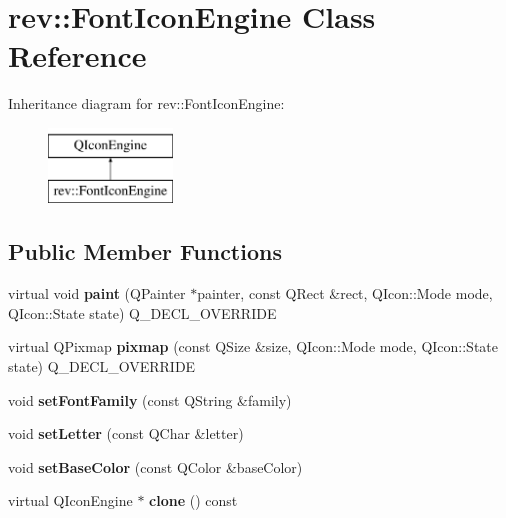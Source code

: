 \hypertarget{classrev_1_1_font_icon_engine}{}\section{rev\+::Font\+Icon\+Engine Class Reference}
\label{classrev_1_1_font_icon_engine}
Inheritance diagram for rev\+::Font\+Icon\+Engine\+:\begin{figure}[H]
\begin{center}
\leavevmode
\includegraphics[height=2.000000cm]{classrev_1_1_font_icon_engine}
\end{center}
\end{figure}
\subsection*{Public Member Functions}
\begin{DoxyCompactItemize}
\item 
\mbox{\label{classrev_1_1_font_icon_engine_a8b9b31bd251825774e56c00556d1ba8c}} 
virtual void {\bfseries paint} (Q\+Painter $\ast$painter, const Q\+Rect \&rect, Q\+Icon\+::\+Mode mode, Q\+Icon\+::\+State state) Q\+\_\+\+D\+E\+C\+L\+\_\+\+O\+V\+E\+R\+R\+I\+DE
\item 
\mbox{\label{classrev_1_1_font_icon_engine_a33de3c43b3fd6347ae22f370c531291a}} 
virtual Q\+Pixmap {\bfseries pixmap} (const Q\+Size \&size, Q\+Icon\+::\+Mode mode, Q\+Icon\+::\+State state) Q\+\_\+\+D\+E\+C\+L\+\_\+\+O\+V\+E\+R\+R\+I\+DE
\item 
\mbox{\label{classrev_1_1_font_icon_engine_a4dd8bc87088c06b14944ada8b11d0620}} 
void {\bfseries set\+Font\+Family} (const Q\+String \&family)
\item 
\mbox{\label{classrev_1_1_font_icon_engine_a7f94f91faff0e3ebe51aaa34952024e4}} 
void {\bfseries set\+Letter} (const Q\+Char \&letter)
\item 
\mbox{\label{classrev_1_1_font_icon_engine_a82ebe67018284bf33c6ddb9b0e7f3436}} 
void {\bfseries set\+Base\+Color} (const Q\+Color \&base\+Color)
\item 
\mbox{\label{classrev_1_1_font_icon_engine_a0d4c7fd7e0ac54dedae83b2d530f605d}} 
virtual Q\+Icon\+Engine $\ast$ {\bfseries clone} () const
\end{DoxyCompactItemize}


